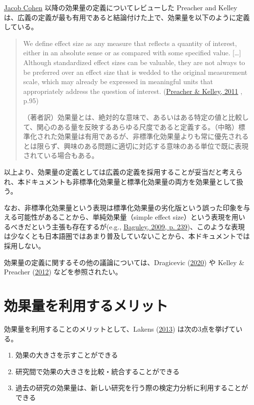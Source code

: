 \documentclass[
  ja=standard, xelatex, base=12pt]{bxjsreport}
\providecommand{\tightlist}{%
  \setlength{\itemsep}{0pt}\setlength{\parskip}{0pt}}
\begin{document}
\href{https://en.wikipedia.org/wiki/Jacob_Cohen_(statistician)}{Jacob Cohen} 以降の効果量の定義についてレビューした Preacher and Kelley は、広義の定義が最も有用であると結論付けた上で、効果量を以下のように定義している。

\begin{quote}
We define effect size as any measure that reflects a quantity of interest, either in an absolute sense or as compared with some specified value. {[}\ldots{]} Although standardized effect sizes can be valuable, they are not always to be preferred over an effect size that is wedded to the original measurement scale, which may already be expressed in meaningful units that appropriately address the question of interest. (\protect\hyperlink{ref-preacher2011}{Preacher \& Kelley, 2011} , p.95)

（著者訳）効果量とは、絶対的な意味で、あるいはある特定の値と比較して、関心のある量を反映するあらゆる尺度であると定義する。（中略）標準化された効果量は有用であるが、非標準化効果量よりも常に優先されるとは限らず、興味のある問題に適切に対応する意味のある単位で既に表現されている場合もある。
\end{quote}

以上より、効果量の定義としては広義の定義を採用することが妥当だと考えられ、本ドキュメントも非標準化効果量と標準化効果量の両方を効果量として扱う。

なお、非標準化効果量という表現は標準化効果量の劣化版という誤った印象を与える可能性があることから、単純効果量（simple effect size）という表現を用いるべきだという主張も存在するが(e.g., \protect\hyperlink{ref-baguley2009}{Baguley, 2009, p. 239})、このような表現は少なくとも日本語圏ではあまり普及していないことから、本ドキュメントでは採用しない。

効果量の定義に関するその他の議論については、Dragicevic (\protect\hyperlink{ref-dragicevic2020mean}{2020}) や Kelley \& Preacher (\protect\hyperlink{ref-kelley2012}{2012}) などを参照されたい。

\hypertarget{ux52b9ux679cux91cfux3092ux5229ux7528ux3059ux308bux30e1ux30eaux30c3ux30c8}{%
\section{効果量を利用するメリット}\label{ux52b9ux679cux91cfux3092ux5229ux7528ux3059ux308bux30e1ux30eaux30c3ux30c8}}

効果量を利用することのメリットとして、Lakens (\protect\hyperlink{ref-lakens2013}{2013}) は次の3点を挙げている。

\begin{enumerate}
\def\labelenumi{\arabic{enumi}.}
\tightlist
\item
  効果の大きさを示すことができる
\item
  研究間で効果の大きさを比較・統合することができる
\item
  過去の研究の効果量は、新しい研究を行う際の検定力分析に利用することができる
\end{enumerate}
\end{document}
